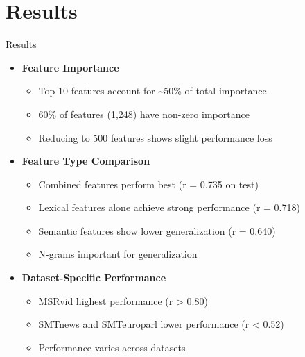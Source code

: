 \documentclass{beamer}
\begin{document}
\section{Results}
\begin{frame}{Results}
    \begin{itemize}
        \item \textbf{Feature Importance}
        \begin{itemize}
            \item Top 10 features account for \textasciitilde{}50\% of total importance
            \item 60\% of features (1,248) have non-zero importance
            \item Reducing to 500 features shows slight performance loss
        \end{itemize}
        \item \textbf{Feature Type Comparison}
        \begin{itemize}
            \item Combined features perform best (r = 0.735 on test)
            \item Lexical features alone achieve strong performance (r = 0.718)
            \item Semantic features show lower generalization (r = 0.640)
            \item N-grams important for generalization
        \end{itemize}
        \item \textbf{Dataset-Specific Performance}
        \begin{itemize}
            \item MSRvid highest performance (r \textgreater{} 0.80)
            \item SMTnews and SMTeuroparl lower performance (r \textless{} 0.52)
            \item Performance varies across datasets
        \end{itemize}
    \end{itemize}
\end{frame}
\end{document}
